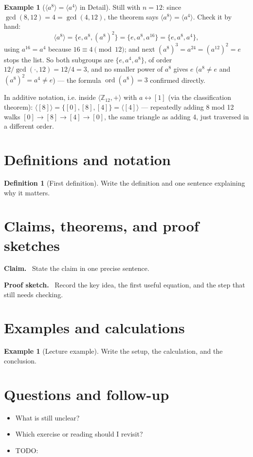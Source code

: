 \documentclass[11pt]{article}
\newcommand{\1}{\mathbf{1}}
\theoremstyle{notestyle}
\theoremstyle{definition}
\newtheorem{definition}[theorem]{Definition}
\newtheorem{example}[theorem]{Example}
\newenvironment{claim}{\par\noindent\textbf{Claim.}\ }{\par}
\newenvironment{proofsketch}{\par\noindent\textbf{Proof sketch.}\ }{\par}
\begin{document}
\begin{example}[$\langle a^{8} \rangle = \langle a^{4} \rangle$ in Detail]
\label{ex:a8-equals-a4}
Still with $n = 12$: since $\gcd(8, 12) = 4 = \gcd(4, 12)$, the theorem says
$\langle a^{8} \rangle = \langle a^{4} \rangle$. Check it by hand:
$$\langle a^{8} \rangle = \{e, a^{8}, (a^{8})^{2}\} = \{e, a^{8}, a^{16}\}
= \{e, a^{8}, a^{4}\},$$
using $a^{16} = a^{4}$ because $16 \equiv 4 \pmod{12}$; and next
$(a^{8})^{3} = a^{24} = (a^{12})^{2} = e$ stops the list. So both subgroups
are $\{e, a^{4}, a^{8}\}$, of order $12/\gcd(\cdot, 12) = 12/4 = 3$, and no
smaller power of $a^{8}$ gives $e$ ($a^{8} \ne e$ and $(a^{8})^{2} = a^{4}
\ne e$) — the formula $\operatorname{ord}(a^{8}) = 3$ confirmed directly.
\par In additive notation, i.e. inside $\langle \mathbb{Z}_{12}, +
\rangle$ with $a \leftrightarrow [1]$ (via the classification theorem):
$\langle [8] \rangle = \{[0], [8], [4]\} = \langle [4] \rangle$ — repeatedly
adding 8 mod 12 walks $[0] \to [8] \to [4] \to [0]$, the same triangle as
adding 4, just traversed in a different order.
\end{example}






\section{Definitions and notation}
\begin{definition}[First definition]
Write the definition and one sentence explaining why it matters.
\end{definition}

\section{Claims, theorems, and proof sketches}
\begin{claim}
State the claim in one precise sentence.
\end{claim}

\begin{proofsketch}
Record the key idea, the first useful equation, and the step that still needs checking.
\end{proofsketch}

\section{Examples and calculations}
\begin{example}[Lecture example]
Write the setup, the calculation, and the conclusion.
\end{example}

\section{Questions and follow-up}
\begin{itemize}
  \item What is still unclear?
  \item Which exercise or reading should I revisit?
  \item TODO:
\end{itemize}
\end{document}
